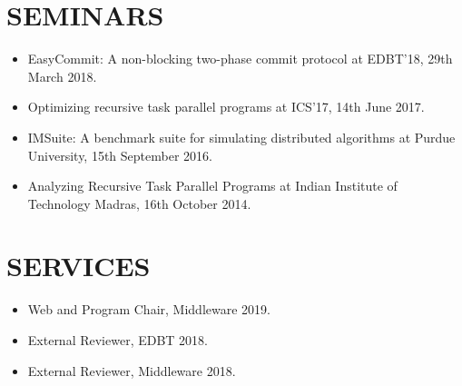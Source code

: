 \documentclass[10pt]{article}
\newcommand*\itbox{\makebox[10cm][l]}
\begin{document}
%
%
%
%


\section*{SEMINARS}
\begin{itemize}
\itemsep-0.2em
\item EasyCommit: A non-blocking two-phase commit protocol at EDBT'18, 29th March 2018.
\item Optimizing recursive task parallel programs at ICS'17, 14th June 2017.
\item IMSuite: A benchmark suite for simulating distributed algorithms at Purdue University, 
15th September 2016.
\item Analyzing Recursive Task Parallel Programs at Indian Institute of Technology
Madras, 16th October 2014.
\end{itemize}


\section*{SERVICES}
\begin{itemize}
\itemsep-0.2em
\item Web and Program Chair, Middleware 2019.
\item External Reviewer, EDBT 2018.
\item External Reviewer, Middleware 2018.
\end{itemize}
\end{document}
